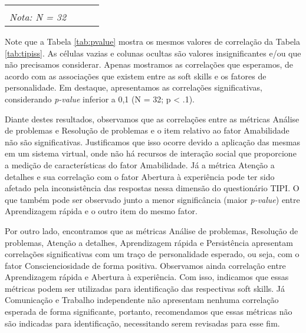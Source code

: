 \begin{sidewaystable}[ph!]
\begin{tabular}{lccc}
    \bottomrule
		\multicolumn{1}{l}{\textbf{}} & & & \\
		\multicolumn{1}{l}{\textit{Nota: N = 32}} & & & \\
    
		
\end{tabular}
\label{tab:pvalue}
\end{sidewaystable}

Note que a Tabela \ref{tab:pvalue} mostra os mesmos valores de correlação da Tabela \ref{tab:tipiss}. 
As células vazias e colunas ocultas são valores insignificantes e/ou que não precisamos considerar.
Apenas mostramos as correlações que esperamos, de acordo com as associações que existem entre as soft skills e os fatores de personalidade.
Em destaque, apresentamos as correlações significativas, considerando \textit{p-value} inferior a 0,1 (N = 32; p < .1).

Diante destes resultados, observamos que as correlações entre as métricas Análise de problemas e Resolução de problemas e o item relativo ao fator Amabilidade não são significativas. Justificamos que isso ocorre devido a aplicação das mesmas em um sistema virtual, onde não há recursos de interação social que proporcione a medição de características do fator Amabilidade. Já a métrica Atenção a detalhes e sua correlação com o fator Abertura à experiência pode ter sido afetado pela inconsistência das respostas nessa dimensão do questionário TIPI. O que também pode ser observado junto a menor significância (maior \textit{p-value}) entre Aprendizagem rápida e o outro item do mesmo fator.

Por outro lado, encontramos que as métricas Análise de problemas, Resolução de problemas, Atenção a detalhes, Aprendizagem rápida e Persistência apresentam correlações significativas com um traço de personalidade esperado, ou seja, com o fator Conscienciosidade de forma positiva.
Observamos ainda correlação entre Aprendizagem rápida e Abertura à experiência.
Com isso, indicamos que essas métricas podem ser utilizadas para identificação das respectivas soft skills.
Já Comunicação e Trabalho independente não apresentam nenhuma correlação esperada de forma significante, portanto, recomendamos que essas métricas não são indicadas para identificação, necessitando serem revisadas para esse fim.

